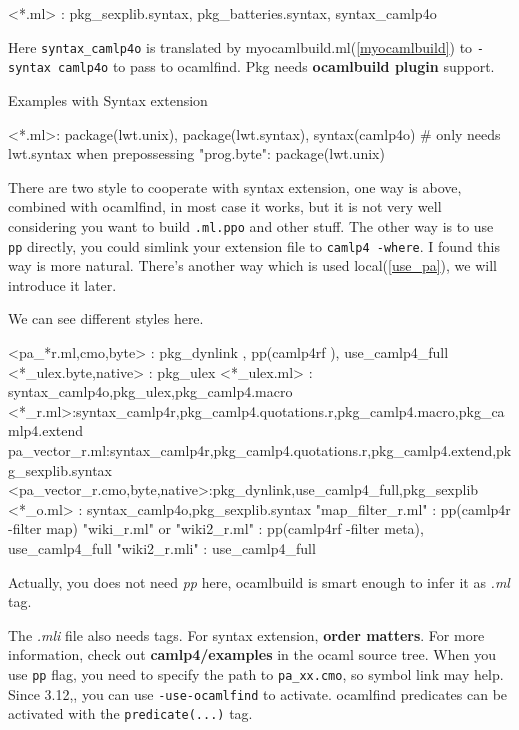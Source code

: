\begin{bashcode}
<*.ml> : pkg_sexplib.syntax, pkg_batteries.syntax, syntax_camlp4o
\end{bashcode}

Here \verb|syntax_camlp4o| is translated by
myocamlbuild.ml(\ref{myocamlbuild}) to \verb|-syntax camlp4o| to pass
to ocamlfind. Pkg needs \textbf{ocamlbuild plugin} support.

Examples with Syntax extension

\begin{bashcode}
<*.ml>: package(lwt.unix), package(lwt.syntax), syntax(camlp4o) # only needs lwt.syntax when prepossessing
"prog.byte": package(lwt.unix)
\end{bashcode}
There are two style to cooperate with syntax extension, one way is
above, combined with ocamlfind, in most case it works, but it is not
very well considering you want to build \verb|.ml.ppo| and other
stuff. The other way is to use \verb|pp| directly, you could simlink
your extension file to \verb|camlp4 -where|. I found this way is more
natural. There's another way which is used local(\ref{use_pa}), we
will introduce it later.

We can see different styles here.

\begin{bashcode}
<pa_*r.{ml,cmo,byte}> : pkg_dynlink , pp(camlp4rf ), use_camlp4_full
<*_ulex.{byte,native}> : pkg_ulex 
<*_ulex.ml> : syntax_camlp4o,pkg_ulex,pkg_camlp4.macro  
<*_r.ml>:syntax_camlp4r,pkg_camlp4.quotations.r,pkg_camlp4.macro,pkg_camlp4.extend 
pa_vector_r.ml:syntax_camlp4r,pkg_camlp4.quotations.r,pkg_camlp4.extend,pkg_sexplib.syntax
<pa_vector_r.{cmo,byte,native}>:pkg_dynlink,use_camlp4_full,pkg_sexplib 
<*_o.ml> : syntax_camlp4o,pkg_sexplib.syntax 
"map_filter_r.ml" : pp(camlp4r -filter map)
"wiki_r.ml" or "wiki2_r.ml"  : pp(camlp4rf -filter meta), use_camlp4_full
"wiki2_r.mli" : use_camlp4_full 
\end{bashcode}
Actually, you does not need \textit{pp} here, ocamlbuild is smart
enough to infer it as \textit{.ml} tag.

The \textit{.mli} file also needs tags. For syntax extension,
\textbf{order matters}. For more information, check out \textbf{
  camlp4/examples} in the ocaml source tree. When you use \verb|pp|
flag, you need to specify the path to \verb|pa_xx.cmo|, so symbol link
may help.  Since 3.12,, you can use \verb|-use-ocamlfind| to
activate. ocamlfind predicates can be activated with the
\verb|predicate(...)| tag.


